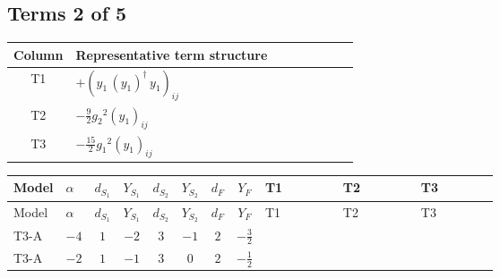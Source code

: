 \documentclass[8pt]{article}
\begin{document}
\begin{landscape}
\subsection*{Terms 2 of 5}
\begin{center}
\begin{tabular}{@{}c >{\raggedright\arraybackslash}p{0.82\linewidth}@{}}
\toprule
Column & Representative term structure \\
\midrule
T1 & \(\displaystyle +\left({y_1}\,\left({y_1}\right)^{\dagger}\,{y_1}\right)_{ij}\) \\
\midrule
T2 & \(\displaystyle -\frac{9}{2} {g_2}^2 \left({y_1}\right)_{ij}\) \\
\midrule
T3 & \(\displaystyle -\frac{15}{2} {g_1}^2 \left({y_1}\right)_{ij}\) \\
\midrule
\bottomrule
\end{tabular}
\end{center}
\smallskip
\tiny
\begin{longtable}{@{}llcccccc >{\raggedright\arraybackslash}p{0.21\linewidth} >{\raggedright\arraybackslash}p{0.21\linewidth} >{\raggedright\arraybackslash}p{0.21\linewidth}@{}}
\toprule
Model & $\alpha$ & $d_{S_1}$ & $Y_{S_1}$ & $d_{S_2}$ & $Y_{S_2}$ & $d_F$ & $Y_F$ & T1 & T2 & T3 \\
\midrule
\endfirsthead
\toprule
Model & $\alpha$ & $d_{S_1}$ & $Y_{S_1}$ & $d_{S_2}$ & $Y_{S_2}$ & $d_F$ & $Y_F$ & T1 & T2 & T3 \\
\midrule
\endhead
T3-A & $-4$ & $1$ & $-2$ & $3$ & $-1$ & $2$ & $-\frac{3}{2}$ & \scriptsize\adjustbox{max width=\linewidth}{$\begin{gathered} +\left({y_1}\,\left({y_1}\right)^{\dagger}\,{y_1}\right)_{ij}\end{gathered}$} & \scriptsize\adjustbox{max width=\linewidth}{$\begin{gathered} -\frac{9}{2} {g_2}^2 \left({y_1}\right)_{ij}\end{gathered}$} & \scriptsize\adjustbox{max width=\linewidth}{$\begin{gathered} -\frac{15}{2} {g_1}^2 \left({y_1}\right)_{ij}\end{gathered}$} \\
\midrule
T3-A & $-2$ & $1$ & $-1$ & $3$ & $0$ & $2$ & $-\frac{1}{2}$ & \scriptsize\adjustbox{max width=\linewidth}{$\begin{gathered} +\left({y_1}\,\left({y_1}\right)^{\dagger}\,{y_1}\right)_{ij}\end{gathered}$} & \scriptsize\adjustbox{max width=\linewidth}{$\begin{gathered} -\frac{9}{2} {g_2}^2 \left({y_1}\right)_{ij}\end{gathered}$} & \scriptsize\adjustbox{max width=\linewidth}{$\begin{gathered} -\frac{3}{2} {g_1}^2 \left({y_1}\right)_{ij}\end{gathered}$} \\

\end{longtable}
\end{landscape}
\end{document}
